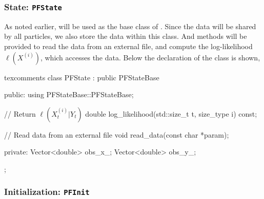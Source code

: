 \subsubsection{State: \texttt{PFState}}

As noted earlier,  will be used as the base class of
. Since the data will be shared by all particles, we also
store the data within this class. And methods will be provided to read the data
from an external file, and compute the log-likelihood $\ell(X^{(i)})$, which
accesses the data. Below the declaration of the class  is
shown,
\begin{cppcode*}{texcomments}
  class PFState : public PFStateBase
  {
      public:
      using PFStateBase::PFStateBase;

      // Return $\ell(X_t^{(i)}|Y_t)$
      double log_likelihood(std::size_t t, size_type i) const;

      // Read data from an external file
      void read_data(const char *param);

      private:
      Vector<double> obs_x_;
      Vector<double> obs_y_;
  };
\end{cppcode*}

\subsubsection{Initialization: \texttt{PFInit}}

